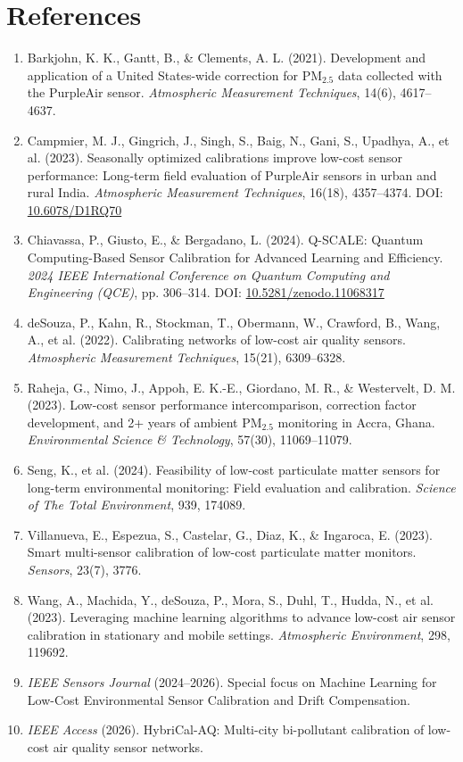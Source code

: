 \documentclass[11pt,a4paper]{article}
\begin{document}
\section*{References}
\begin{enumerate}
    \item[{[1]}] Barkjohn, K. K., Gantt, B., \& Clements, A. L. (2021). Development and application of a United States-wide correction for $\text{PM}_{2.5}$ data collected with the PurpleAir sensor. \textit{Atmospheric Measurement Techniques}, 14(6), 4617--4637.
    \item[{[2]}] Campmier, M. J., Gingrich, J., Singh, S., Baig, N., Gani, S., Upadhya, A., et al. (2023). Seasonally optimized calibrations improve low-cost sensor performance: Long-term field evaluation of PurpleAir sensors in urban and rural India. \textit{Atmospheric Measurement Techniques}, 16(18), 4357--4374. DOI: \href{https://doi.org/10.6078/D1RQ70}{10.6078/D1RQ70}
    \item[{[3]}] Chiavassa, P., Giusto, E., \& Bergadano, L. (2024). Q-SCALE: Quantum Computing-Based Sensor Calibration for Advanced Learning and Efficiency. \textit{2024 IEEE International Conference on Quantum Computing and Engineering (QCE)}, pp. 306--314. DOI: \href{https://doi.org/10.5281/zenodo.11068317}{10.5281/zenodo.11068317}
    \item[{[4]}] deSouza, P., Kahn, R., Stockman, T., Obermann, W., Crawford, B., Wang, A., et al. (2022). Calibrating networks of low-cost air quality sensors. \textit{Atmospheric Measurement Techniques}, 15(21), 6309--6328.
    \item[{[5]}] Raheja, G., Nimo, J., Appoh, E. K.-E., Giordano, M. R., \& Westervelt, D. M. (2023). Low-cost sensor performance intercomparison, correction factor development, and 2+ years of ambient $\text{PM}_{2.5}$ monitoring in Accra, Ghana. \textit{Environmental Science \& Technology}, 57(30), 11069--11079.
    \item[{[6]}] Seng, K., et al. (2024). Feasibility of low-cost particulate matter sensors for long-term environmental monitoring: Field evaluation and calibration. \textit{Science of The Total Environment}, 939, 174089.
    \item[{[7]}] Villanueva, E., Espezua, S., Castelar, G., Diaz, K., \& Ingaroca, E. (2023). Smart multi-sensor calibration of low-cost particulate matter monitors. \textit{Sensors}, 23(7), 3776.
    \item[{[8]}] Wang, A., Machida, Y., deSouza, P., Mora, S., Duhl, T., Hudda, N., et al. (2023). Leveraging machine learning algorithms to advance low-cost air sensor calibration in stationary and mobile settings. \textit{Atmospheric Environment}, 298, 119692.
    \item[{[9]}] \textit{IEEE Sensors Journal} (2024--2026). Special focus on Machine Learning for Low-Cost Environmental Sensor Calibration and Drift Compensation.
    \item[{[10]}] \textit{IEEE Access} (2026). HybriCal-AQ: Multi-city bi-pollutant calibration of low-cost air quality sensor networks.
\end{enumerate}
\end{document}
